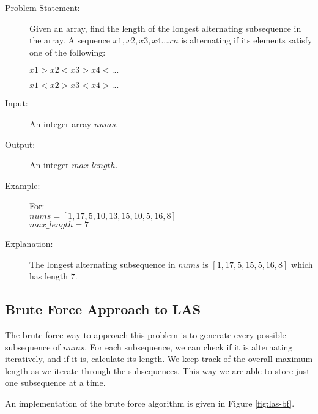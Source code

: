 \begin{description}
    \item[Problem Statement:]
        Given an array, find the length of the longest alternating subsequence in the array.
        A sequence ${x1,x2,x3,x4...xn}$ is alternating if its elements satisfy one of the following:

        $x1>x2<x3>x4<...$
        
        $x1<x2>x3<x4>...$
        
    \item[Input:]
        An integer array $nums$.
        
    \item[Output:] 
        An integer $max\_length$.
        
    \item[Example:] For:\\
        $nums = [1,17,5,10,13,15,10,5,16,8]$\\
        $max\_length = 7$

    \item[Explanation:]
        The longest alternating subsequence in $nums$ is $[1,17,5,15,5,16,8]$ which has length $7$.

\end{description}

\subsection{Brute Force Approach to LAS}\label{subsec:las-bf}

The brute force way to approach this problem is to generate every possible subsequence of $nums$. 
For each subsequence, we can check if it is alternating iteratively, and if it is, calculate its length.
We keep track of the overall maximum length as we iterate through the subsequences. This way we are able to store just one subsequence at a time.

An implementation of the brute force algorithm is given in Figure \ref{fig:las-bf}.

